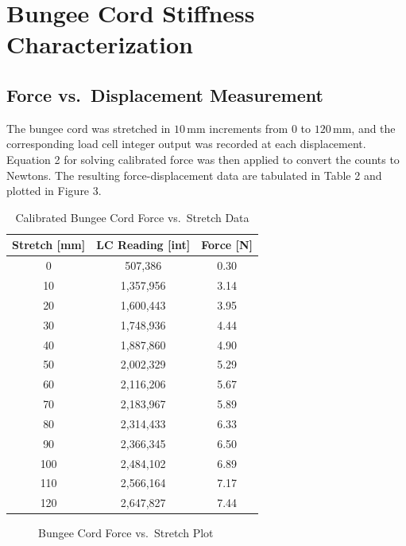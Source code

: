 \documentclass{article}
\begin{document}
\section{Bungee Cord Stiffness Characterization}

\subsection{Force vs.\ Displacement Measurement}

The bungee cord was stretched in $10$\,mm increments from $0$ to $120$\,mm, and the corresponding load cell integer output was recorded at each displacement. Equation 2 for solving calibrated force was then applied to convert the counts to Newtons. The resulting force-displacement data are tabulated in Table 2 and plotted in Figure 3.

\begin{table}[H]
    \centering
    \caption{Calibrated Bungee Cord Force vs.\ Stretch Data}
    \label{tab:bungee_data}
    \begin{tabular}{ccc}
        \toprule
        \textbf{Stretch [mm]} & \textbf{LC Reading [int]} & \textbf{Force [N]} \\
        \midrule
        0   & 507,386   & 0.30 \\
        10  & 1,357,956 & 3.14 \\
        20  & 1,600,443 & 3.95 \\
        30  & 1,748,936 & 4.44 \\
        40  & 1,887,860 & 4.90 \\
        50  & 2,002,329 & 5.29 \\
        60  & 2,116,206 & 5.67 \\
        70  & 2,183,967 & 5.89 \\
        80  & 2,314,433 & 6.33 \\
        90  & 2,366,345 & 6.50 \\
        100 & 2,484,102 & 6.89 \\
        110 & 2,566,164 & 7.17 \\
        120 & 2,647,827 & 7.44 \\
        \bottomrule
    \end{tabular}
\end{table}

\begin{figure}[H]
    \centering
    \caption{Bungee Cord Force vs.\ Stretch Plot}
    \label{fig:bungee_stiff}
\end{figure}
\end{document}
